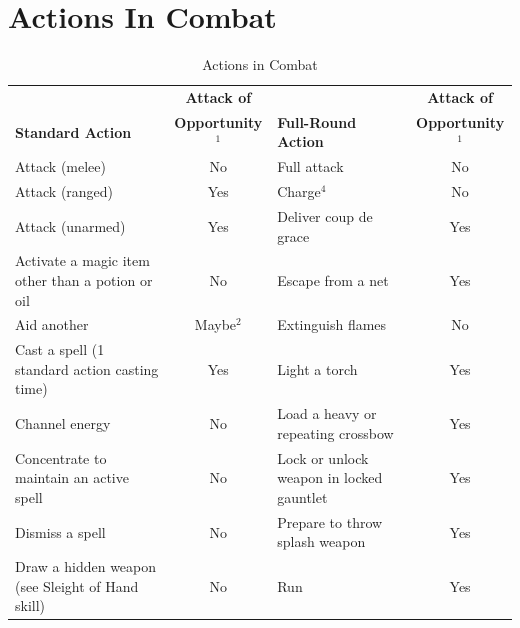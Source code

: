 \vfill\null
\columnbreak

\section{Actions In Combat}

\begin{table}[]
\sffamily
\setlength{\tabcolsep}{1pt}
\caption{Actions in Combat}
\begin{tabular}{lclc}
                                                 & \textbf{Attack of}    &                                           & \textbf{Attack of}    \\
\textbf{Standard Action}                         & \textbf{Opportunity\(^{1}\)} & \textbf{Full-Round Action}         & \textbf{Opportunity\(^{1}\)} \\
Attack (melee)                                   & No                    & Full attack                               & No                    \\
Attack (ranged)                                  & Yes                   & Charge\(^{4}\)                            & No                    \\
Attack (unarmed)                                 & Yes                   & Deliver coup de grace                     & Yes                   \\
Activate a magic item other than a potion or oil & No                    & Escape from a net                         & Yes                   \\
Aid another                                      & Maybe\(^{2}\)         & Extinguish flames                         & No                    \\
Cast a spell (1 standard action casting time)    & Yes                   & Light a torch                             & Yes                   \\
Channel energy                                   & No                    & Load a heavy or repeating crossbow        & Yes                   \\
Concentrate to maintain an active spell          & No                    & Lock or unlock weapon in locked gauntlet  & Yes                   \\
Dismiss a spell                                  & No                    & Prepare to throw splash weapon            & Yes                   \\
Draw a hidden weapon (see Sleight of Hand skill) & No                    & Run                                       & Yes                   \\

\end{tabular}
\end{table}

